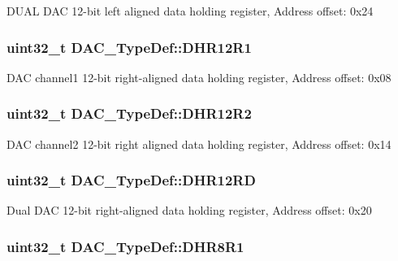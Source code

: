 D\-U\-A\-L D\-A\-C 12-\/bit left aligned data holding register, Address offset\-: 0x24 \hypertarget{struct_d_a_c___type_def_afbfd2855cdb81939b4efc58e08aaf3e5}{
\subsubsection[{D\-H\-R12\-R1}]{ uint32\-\_\-t D\-A\-C\-\_\-\-Type\-Def\-::\-D\-H\-R12\-R1}}\label{struct_d_a_c___type_def_afbfd2855cdb81939b4efc58e08aaf3e5}
D\-A\-C channel1 12-\/bit right-\/aligned data holding register, Address offset\-: 0x08 \hypertarget{struct_d_a_c___type_def_ab1f777540c487c26bf27e6fa37a644cc}{
\subsubsection[{D\-H\-R12\-R2}]{ uint32\-\_\-t D\-A\-C\-\_\-\-Type\-Def\-::\-D\-H\-R12\-R2}}\label{struct_d_a_c___type_def_ab1f777540c487c26bf27e6fa37a644cc}
D\-A\-C channel2 12-\/bit right aligned data holding register, Address offset\-: 0x14 \hypertarget{struct_d_a_c___type_def_affa5cc9fe0cc9eb594d703bdc9d9abd9}{
\subsubsection[{D\-H\-R12\-R\-D}]{ uint32\-\_\-t D\-A\-C\-\_\-\-Type\-Def\-::\-D\-H\-R12\-R\-D}}\label{struct_d_a_c___type_def_affa5cc9fe0cc9eb594d703bdc9d9abd9}
Dual D\-A\-C 12-\/bit right-\/aligned data holding register, Address offset\-: 0x20 \hypertarget{struct_d_a_c___type_def_a3a382d341fb608a04390bacb8c00b0f0}{
\subsubsection[{D\-H\-R8\-R1}]{ uint32\-\_\-t D\-A\-C\-\_\-\-Type\-Def\-::\-D\-H\-R8\-R1}}\label{struct_d_a_c___type_def_a3a382d341fb608a04390bacb8c00b0f0}
